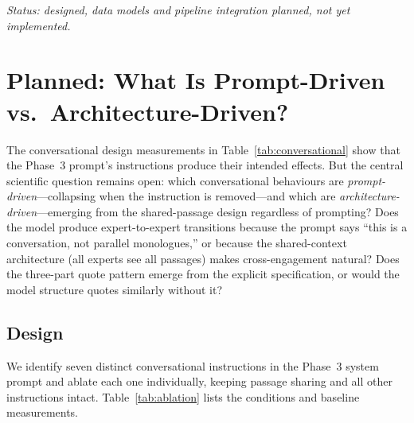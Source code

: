 \documentclass[final]{clv2025}
\begin{document}
\emph{Status: designed, data models and pipeline integration planned,
not yet implemented.}


\section{Planned: What Is Prompt-Driven vs.\ Architecture-Driven?}
\label{sec:ablation}

The conversational design measurements in
Table~\ref{tab:conversational} show that the Phase~3 prompt's
instructions produce their intended effects.  But the central
scientific question remains open: which conversational behaviours are
\emph{prompt-driven}---collapsing when the instruction is
removed---and which are \emph{architecture-driven}---emerging from the
shared-passage design regardless of prompting?  Does the model produce
expert-to-expert transitions because the prompt says ``this is a
conversation, not parallel monologues,'' or because the shared-context
architecture (all experts see all passages) makes cross-engagement
natural?  Does the three-part quote pattern emerge from the explicit
specification, or would the model structure quotes similarly without
it?

\subsection{Design}

We identify seven distinct conversational instructions in the Phase~3
system prompt and ablate each one individually, keeping passage
sharing and all other instructions intact.
Table~\ref{tab:ablation} lists the conditions and baseline
measurements.
\end{document}
